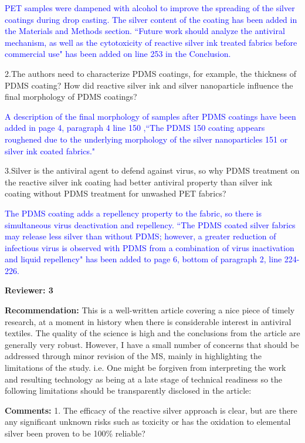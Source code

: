 \documentclass[12pt]{letter}
\newcommand{\blue}[1]{\textcolor{blue}{#1}} %
\begin{document}
\blue{PET samples were dampened with alcohol to improve the spreading of the silver coatings during drop casting. The silver content of the coating has been added in the Materials and Methods section. ``Future work should analyze the antiviral mechanism, as well as the cytotoxicity of reactive silver ink treated fabrics before
commercial use" has been added on line 253 in the Conclusion. }

2.The authors need to characterize PDMS coatings, for example, the thickness of PDMS coating? How did reactive silver ink and silver nanoparticle influence the final morphology of PDMS coatings?

\blue{A description of the final morphology of samples after PDMS coatings have been added in page 4, paragraph 4 line 150 ,``The PDMS 150
coating appears roughened due to the underlying morphology of the silver nanoparticles 151
or silver ink coated fabrics." }

3.Silver is the antiviral agent to defend against virus, so why PDMS treatment on the reactive silver ink coating had better antiviral property than silver ink coating without PDMS treatment for unwashed PET fabrics?

\blue{The PDMS coating adds a repellency property to the fabric, so there is simultaneous virus deactivation and repellency. ``The PDMS coated silver 
fabrics may release less silver than without PDMS; however, a greater reduction of 
infectious virus is observed with PDMS from a combination of virus inactivation and 
liquid repellency" has been added to page 6, bottom of paragraph 2, line 224-226.}

\newpage
\textbf{Reviewer: 3}

\textbf{Recommendation:} This is a well-written article covering a nice piece of timely research, at a moment in history when there is considerable interest in antiviral textiles. The quality of the science is high and the conclusions from the article are generally very robust. However, I have a small number of concerns that should be addressed through minor revision of the MS, mainly in highlighting the limitations of the study. i.e. One might be forgiven from interpreting the work and resulting technology as being at a late stage of technical readiness so the following limitations should be transparently disclosed in the article:

\textbf{Comments:} 
1. The efficacy of the reactive silver approach is clear, but are there any significant unknown risks such as toxicity or has the oxidation to elemental silver been proven to be 100\% reliable?
\end{document}
